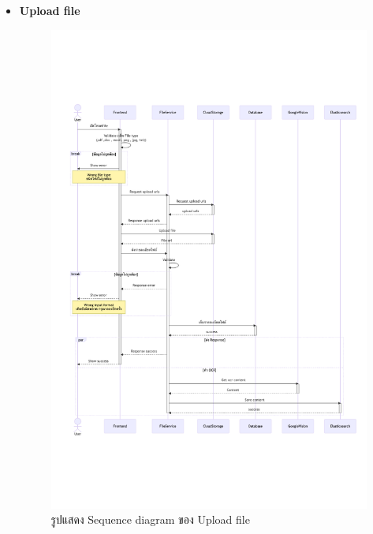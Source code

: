 \documentclass[12pt,oneside,openright,a4paper]{cpe-thai-project}
\begin{document}
\begin{itemize}
    \newpage
    \item \textbf{Upload file} \\
    \begin{figure}[!ht]\centering
        \includegraphics[width=13cm, trim={0 6cm 0 6cm},clip]{./assets/sequence-diagram/upload-file.png}
        \caption{รูปแสดง Sequence diagram ของ Upload file}\label{fig:sqUploadFile}
    \end{figure}



\end{itemize}
\end{document}
